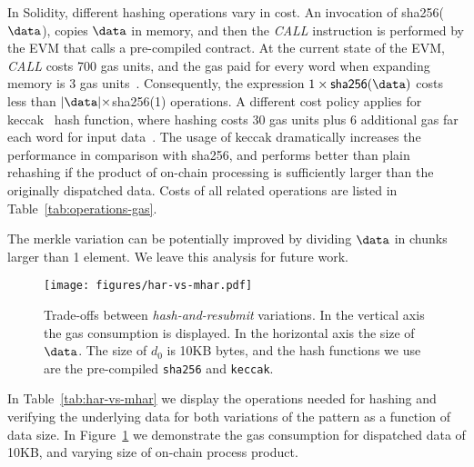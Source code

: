 In Solidity, different hashing operations vary in cost. An invocation of
\textsf{sha256}($\data$), copies $\data$ in memory, and then the
\emph{CALL} instruction is performed by the EVM that calls a pre-compiled
contract. At the current state of the EVM, \emph{CALL} costs 700 gas units, and
the gas paid for every word when expanding memory is 3 gas units~\cite{wood}.
Consequently, the expression $1 \times \textsf{sha256}(\data)$ costs less than
$|\data| \times $\textsf{sha256}(1) operations. A different cost policy applies
for \textsf{keccak}~\cite{keccak} hash function, where hashing costs 30 gas
units plus 6 additional gas far each word for input data~\cite{wood}. The usage
of \textsf{keccak} dramatically increases the performance in comparison with
\textsf{sha256}, and performs better than plain rehashing if the product of
on-chain processing is sufficiently larger than the originally dispatched data.
Costs of all related operations are listed in Table~\ref{tab:operations-gas}.

The merkle variation can be potentially improved by dividing $\data$ in
chunks larger than 1 element. We leave this analysis for future work.

\begin{figure}[H]
    \centering
    \texttt{[image: figures/har-vs-mhar.pdf]}
    \caption{Trade-offs between \emph{hash-and-resubmit} variations. In the
    vertical axis the gas consumption is displayed. In the horizontal axis the
    size of $\data$. The size of $d_0$ is 10KB bytes, and the hash functions we
    use are the pre-compiled \texttt{sha256} and \texttt{keccak}.}
    \label{fig:har-vs-mhar}
\end{figure}

In Table~\ref{tab:har-vs-mhar} we display the operations needed for hashing and
verifying the underlying data for both variations of the pattern as a function
of data size. In Figure~\ref{fig:har-vs-mhar} we demonstrate the gas
consumption for dispatched data of 10KB, and varying size of on-chain
process product.



